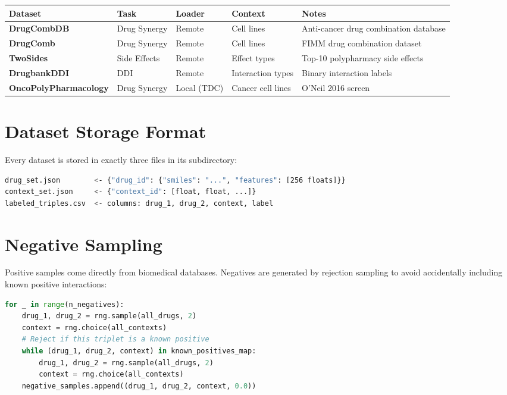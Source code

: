 \documentclass[12pt,a4paper,oneside]{book}
\begin{document}
\begin{longtable}{>{\bfseries}p{3.5cm}p{2.2cm}p{2.5cm}p{2cm}p{3.8cm}}
\toprule
\textbf{Dataset} & \textbf{Task} & \textbf{Loader} & \textbf{Context} & \textbf{Notes} \\
\midrule\endhead
DrugCombDB & Drug Synergy & Remote & Cell lines & Anti-cancer drug combination database \\
DrugComb & Drug Synergy & Remote & Cell lines & FIMM drug combination dataset \\
TwoSides & Side Effects & Remote & Effect types & Top-10 polypharmacy side effects \\
DrugbankDDI & DDI & Remote & Interaction types & Binary interaction labels \\
OncoPolyPharmacology & Drug Synergy & Local (TDC) & Cancer cell lines & O'Neil 2016 screen \\
\bottomrule
\end{longtable}

\section{Dataset Storage Format}

Every dataset is stored in exactly three files in its subdirectory:

\begin{lstlisting}[language=bash]
drug_set.json        <- {"drug_id": {"smiles": "...", "features": [256 floats]}}
context_set.json     <- {"context_id": [float, float, ...]}
labeled_triples.csv  <- columns: drug_1, drug_2, context, label
\end{lstlisting}

\section{Negative Sampling}

Positive samples come directly from biomedical databases. Negatives are generated by rejection sampling to avoid accidentally including known positive interactions:

\begin{lstlisting}[language=Python]
for _ in range(n_negatives):
    drug_1, drug_2 = rng.sample(all_drugs, 2)
    context = rng.choice(all_contexts)
    # Reject if this triplet is a known positive
    while (drug_1, drug_2, context) in known_positives_map:
        drug_1, drug_2 = rng.sample(all_drugs, 2)
        context = rng.choice(all_contexts)
    negative_samples.append((drug_1, drug_2, context, 0.0))
\end{lstlisting}
\end{document}
